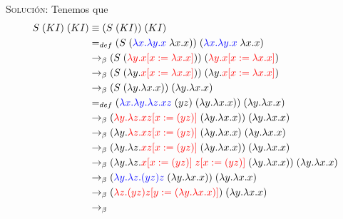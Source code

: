 \documentclass[letterpaper,11pt]{article}
\begin{document}
\begin{enumerate}
\begin{enumerate}
        \textsc{Solución:} Tenemos que 
        \begin{align*}
            S \; (KI) \; (KI) 
            &\equiv (S \; (KI)) \; (KI) \\ 
            &=_{def} (S \; (\textcolor{blue}{\lambda x. \lambda y.x} \; 
                            \lambda x.x)) \;
                           (\textcolor{blue}{\lambda x. \lambda y.x} \; 
                            \lambda x.x) \\
            &\rightarrow_{\beta}
            (S \; (\textcolor{red}{\lambda y.x [x := \lambda x.x]})) \;
            (\textcolor{red}{\lambda y.x [x := \lambda x.x]}) \\
            &\rightarrow_{\beta}
            (S \; (\lambda y. \textcolor{red}{x [x := \lambda x.x]})) \; 
            (\lambda y. \textcolor{red}{x [x := \lambda x.x]}) \\
            &\rightarrow_{\beta} 
            (S \; (\lambda y. \lambda x.x)) \; (\lambda y. \lambda x.x) \\
            &=_{def} (\textcolor{blue}{\lambda x. \lambda y. \lambda z.xz} \; 
                     (yz) \; (\lambda y. \lambda x.x)) \; 
                     (\lambda y. \lambda x.x) \\
            &\rightarrow_{\beta}
            (\textcolor{red}{\lambda y. \lambda z.xz [x := (yz)]} \; 
            (\lambda y. \lambda x.x)) \; (\lambda y. \lambda x.x) \\
            &\rightarrow_{\beta}
            (\lambda y. \textcolor{red}{\lambda z.xz [x := (yz)]} \; 
            (\lambda y. \lambda x.x) \; (\lambda y. \lambda x.x) \\ 
            &\rightarrow_{\beta}
            (\lambda y. \lambda z. \textcolor{red}{xz [x := (yz)]} \; 
            (\lambda y. \lambda x.x)) \; (\lambda y. \lambda x.x) \\
            &\rightarrow_{\beta}
            (\lambda y. \lambda z. \textcolor{red}{x [x := (yz)] \; 
            z [x := (yz)]} 
            \; (\lambda y. \lambda x.x)) \; (\lambda y. \lambda x.x) \\
            &\rightarrow_{\beta}
            (\textcolor{blue}{\lambda y. \lambda z.(yz)z} \; 
            (\lambda y. \lambda x.x)) \; (\lambda y. \lambda x.x) \\
            &\rightarrow_{\beta}
            (\textcolor{red}{\lambda z.(yz)z 
            [y := (\lambda y. \lambda x.x)]}) \; (\lambda y. \lambda x.x) \\
            &\rightarrow_{\beta}

\end{align*}
\end{enumerate}
\end{enumerate}
\end{document}
